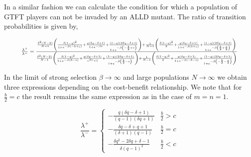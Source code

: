 \documentclass[11pt]{article}
\theoremstyle{plainCl1}
\theoremstyle{plainCl2}
\begin{document}
In a similar fashion we can calculate the condition for which a population of
GTFT players can not be invaded by an ALLD mutant. The ratio of transition
probabilities is given by,

\begin{equation}
  \resizebox{.9\textwidth}{!}
  {%
  $\frac{\lambda^{+}}{\lambda^{-}} =
  \frac{\frac{\delta^{2} \left(N - 2\right)}{N-1} \left(\frac{\delta \left(1 - q\right)^{2}}{1 + e^{- \beta \left(- b + c\right)}} + \frac{q \left(\delta q - \delta + 1\right)}{1 + e^{- \beta c}} + \frac{\left(1 - q\right) \left(2 \delta q - \delta + 1\right)}{1 + e^{- \beta \left(- \frac{b}{2} + c\right)}}\right) + \frac{1}{N-1}\left(\frac{\delta \left(1 - q\right)^{2}}{2} + \frac{q \left(\delta q - \delta + 1\right)}{1 + e^{- \beta \left(b + c\right)}} + \frac{\left(1 - q\right) \left(2 \delta q - \delta + 1\right)}{1 + e^{- \beta \left(\frac{b}{2} + \frac{c}{2}\right)}}\right)}
  {\frac{\delta^{2} \left(N - 2\right)}{N-1} \left(\frac{\delta \left(1 - q\right)^{2}}{1 + e^{- \beta \left(b - c\right)}} + \frac{q \left(\delta q - \delta + 1\right)}{e^{\beta c} + 1} + \frac{\left(1 - q\right) \left(2 \delta q - \delta + 1\right)}{1 + e^{- \beta \left(\frac{b}{2} - c\right)}}\right) + \frac{1}{N-1} \left(\frac{\delta \left(1 - q\right)^{2}}{2} + \frac{q \left(\delta q - \delta + 1\right)}{1 + e^{- \beta \left(- b - c\right)}} + \frac{\left(1 - q\right) \left(2 \delta q - \delta + 1\right)}{1 + e^{- \beta \left(- \frac{b}{2} - \frac{c}{2}\right)}}\right)}
  $}
\end{equation}

In the limit of strong selection \(\beta \rightarrow \infty\) and large
populations \(N \rightarrow \infty \) we obtain three expressions depending on
the cost-benefit relationship. We note that for \(\frac{b}{2}=c\) the result
remains the same expression as in the case of \(m=n=1\).

\begin{equation}
\frac{\lambda^{+}}{\lambda^{-}} = 
\begin{cases}
  - \frac{q \left(\delta q - \delta + 1\right)}{\left(q - 1\right) \left(\delta q + 1\right)}  & \frac{b}{2} > c \\[0.5cm]
  - \frac{\delta q - \delta + q + 1}{\left(\delta + 1\right) \left(q - 1\right)}  & \frac{b}{2} = c \\[0.5cm]
  - \frac{\delta q^{2} - 2 \delta q + \delta - 1}{\delta \left(q - 1\right)^{2}} & \frac{b}{2} < c
\end{cases}
\end{equation}
\end{document}

